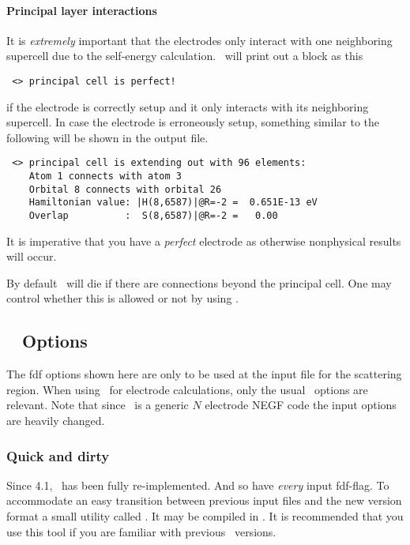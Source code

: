 \paragraph{Principal layer interactions} %
%

It is \emph{extremely} important that the electrodes only interact
with one neighboring supercell due to the self-energy
calculation. \tsiesta\ will print out a block as this
\begin{verbatim}
 <> principal cell is perfect!
\end{verbatim}
if the electrode is correctly setup and it only interacts with its
neighboring supercell.
%
In case the electrode is erroneously setup, something similar to the
following will be shown in the output file.
\begin{verbatim}
 <> principal cell is extending out with 96 elements:
    Atom 1 connects with atom 3
    Orbital 8 connects with orbital 26
    Hamiltonian value: |H(8,6587)|@R=-2 =  0.651E-13 eV
    Overlap          :  S(8,6587)|@R=-2 =   0.00    
\end{verbatim}
It is imperative that you have a \emph{perfect} electrode as otherwise
nonphysical results will occur.

By default \tsiesta\ will die if there are connections beyond the
principal cell. One may control whether this is allowed or not by
using .

\subsection{\texorpdfstring{\tsiesta\ }{TranSIESTA} Options}

The fdf options shown here are only to be used at the input file for
the scattering region. When using \tsiesta\ for electrode
calculations, only the usual \siesta\ options are relevant.
%
Note that since \tsiesta\ is a generic $N$ electrode NEGF code the
input options are heavily changed.

\subsubsection{Quick and dirty}

Since 4.1, \tsiesta\ has been fully re-implemented. And so have
\emph{every} input fdf-flag. To accommodate an easy transition between
previous input files and the new version format a small utility called
. It may be compiled in . It is
recommended that you use this tool if you are familiar with previous
\tsiesta\ versions.

